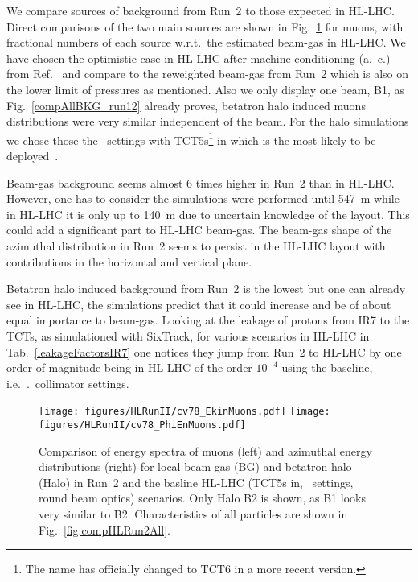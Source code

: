 We compare sources of background from Run~2 to those expected in HL-LHC. Direct comparisons of the two main sources are shown in Fig.~\ref{fig:HLR2Muons} for muons, with fractional numbers of each source w.r.t.~the estimated beam-gas in HL-LHC. We have chosen the optimistic case in HL-LHC after machine conditioning (a.~c.) from Ref.~\cite{ipac2015_rkh} and compare to the reweighted beam-gas from Run~2 which is also on the lower limit of pressures as mentioned. Also we only display one beam, B1, as Fig.~\ref{compAllBKG_run12} already proves, betatron halo induced muons distributions were very similar independent of the beam. For the halo simulations we chose those the \twosigmaret~settings with TCT5s\footnote{The name has officially changed to TCT6 in a more recent version.} in which is the most likely to be deployed~\cite{layoutProcRod}.

Beam-gas background seems almost 6 times higher in Run~2 than in HL-LHC. However, one has to consider the simulations were performed until 547~m while in HL-LHC it is only up to 140~m due to uncertain knowledge of the layout. This could add a significant part to HL-LHC beam-gas. The beam-gas shape of the azimuthal distribution in Run~2 seems to persist in the HL-LHC layout with contributions in the horizontal and vertical plane.


Betatron halo induced background from Run~2 is the lowest but one can already see in HL-LHC, the simulations predict that it could increase and be of about equal importance to beam-gas. Looking at the leakage of protons from IR7 to the TCTs, as simulationed with SixTrack, for various scenarios in HL-LHC in Tab.~\ref{leakageFactorsIR7} one notices they jump from Run~2 to HL-LHC by one order of magnitude being in HL-LHC of the order $10^{-4}$ using the baseline, i.e.~\twosigmaret.~collimator settings. 

\begin{figure}
\begin{center}
  \texttt{[image: figures/HLRunII/cv78\_EkinMuons.pdf]}
  \texttt{[image: figures/HLRunII/cv78\_PhiEnMuons.pdf]}
\end{center}
\vspace{-0.6cm}
 \caption{Comparison of energy spectra of muons (left) and azimuthal energy distributions (right) for local beam-gas (BG) and betatron halo (Halo) in Run~2 and the basline HL-LHC (TCT5s in, \twosigmaret~settings, round beam optics) scenarios. Only Halo B2 is shown, as B1 looks very similar to B2. Characteristics of all particles are shown in Fig.~\ref{fig:compHLRun2All}.
  \label{fig:HLR2Muons}}
\end{figure}
